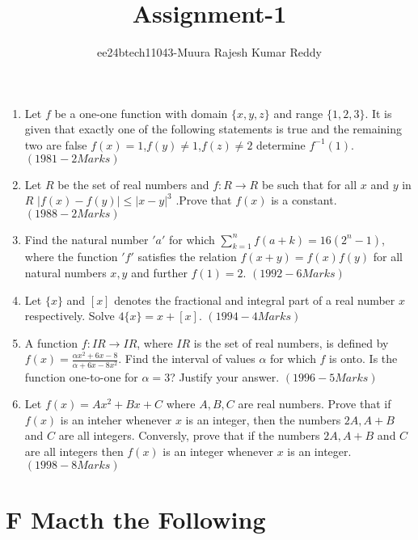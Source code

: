 \documentclass[journal,12pt,twocolumn]{IEEEtran}
\theoremstyle{remark}
\begin{document}

\vspace{3cm}

\title{Assignment-1}
\author{ee24btech11043-Muura Rajesh Kumar Reddy}
\maketitle
\newpage
\bigskip

\renewcommand{\thefigure}{\theenumi}
\renewcommand{\thetable}{\theenumi}
 
                \begin{enumerate}
			\item Let $f$ be a one-one function with domain $\{x,y,z\}$ and range $\{1,2,3\}$. It is given that exactly one of the following statements is true and the remaining two are false ${f(x)=1}$,${f(y)\neq1}$,$f(z)\neq2$ determine $f^{-1}(1)$. \hfill${(1981 - 2 Marks)}$
	\item Let $R$ be the set of real numbers and $f:R \to R$ be such that for all $x$ and $y$ in $R$ ${|f(x)-f(y)| \le |x-y|^3}$ .Prove that $f(x)$ is a constant. \hfill${(1988 - 2 Marks)}$
	\item Find the natural number $'a'$ for which ${\sum\limits_{k=1}^nf(a+k)=16(2^n -1)}$, where the function $'f'$ satisfies the relation ${f(x+y)=f(x)f(y)}$ for all natural numbers $x,y$ and further ${f(1)=2}$. \hfill${(1992- 6 Marks)}$
	\item Let $\{x\}$ and $[x]$ denotes the fractional and integral part of a real number $x$ respectively. Solve $4\{x\}=x+[x]$. \hfill${(1994- 4 Marks)}$
	\item A function $f:IR\to IR$, where $IR$ is the set of real numbers, is defined by ${f(x)=\frac{\alpha x^2 +6x -8}{\alpha +6x-8x^2}}$. Find the interval of values $\alpha$ for which $f$ is onto. Is the function one-to-one for $\alpha=3$? Justify your answer. \hfill${(1996- 5 Marks)}$
	\item Let ${f(x)=Ax^2+Bx+C}$ where $A,B,C$ are real numbers. Prove that if $f(x)$ is an inteher whenever $x$ is an integer, then the numbers $2A,A+B$ and $C$ are all integers. Conversly, prove that if the numbers $2A,A+B$ and $C$ are all integers then $f(x)$ is an integer whenever $x$ is an integer. \hfill${(1998- 8 Marks)}$ 
		 \end{enumerate}
	\onecolumn
	\section*{F Macth the Following}
	
\end{document}
